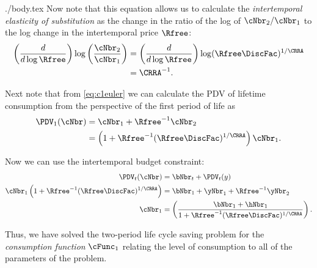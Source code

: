 \documentclass{handout}
\begin{document}
\begin{verbatimwrite}{./body.tex}
  Now note that this equation allows us to calculate the \textit{intertemporal
    elasticity of substitution} as the change in the ratio of
  the log of $\cNbr_{2}/\cNbr_{1}$ to the log change in the
  intertemporal price $\Rfree$:
  \begin{equation}\begin{gathered}\begin{aligned}
        \left(\frac{d}{d \log \Rfree}\right) \log \left(\frac{\cNbr_{2}}{\cNbr_{1}}\right) & =    \left(\frac{d}{d \log \Rfree}\right) \log (\Rfree \DiscFac)^{1/\CRRA}
        \\ & =  \CRRA^{-1}.
      \end{aligned}\end{gathered}\end{equation}

  Next note that from \eqref{eq:c1euler} we can calculate the PDV of lifetime consumption
  from the perspective of the first period of life as
  \begin{equation}\begin{gathered}\begin{aligned}
        \PDV_{1}(\cNbr) & =  \cNbr_{1} + \Rfree^{-1}\cNbr_{2}  \\
        & =  \left(1+\Rfree^{-1}(\Rfree\DiscFac)^{1/\CRRA}\right)\cNbr_{1}.
      \end{aligned}\end{gathered}\end{equation}

  Now we can use the intertemporal budget constraint:
  \begin{equation}\begin{gathered}\begin{aligned}
        \PDV_{t}(\cNbr) & =  \bNbr_{t}+\PDV_{t}(y)
        \\      \cNbr_{1}\left(1+\Rfree^{-1}(\Rfree\DiscFac)^{1/\CRRA}\right) & =  \bNbr_{1}+\yNbr_{1}+\Rfree^{-1}\yNbr_{2}  \\
        \cNbr_{1} & =  \left(\frac{\bNbr_{1}+\hNbr_{1}}{1+\Rfree^{-1}(\Rfree\DiscFac)^{1/\CRRA}}\right).
      \end{aligned}\end{gathered}\end{equation}

  Thus, we have solved the two-period life cycle saving problem for the
  \textit{consumption function} $\cFunc_{1}$ relating the level of consumption to all of the parameters of the problem.


\end{verbatimwrite}
\end{document}
